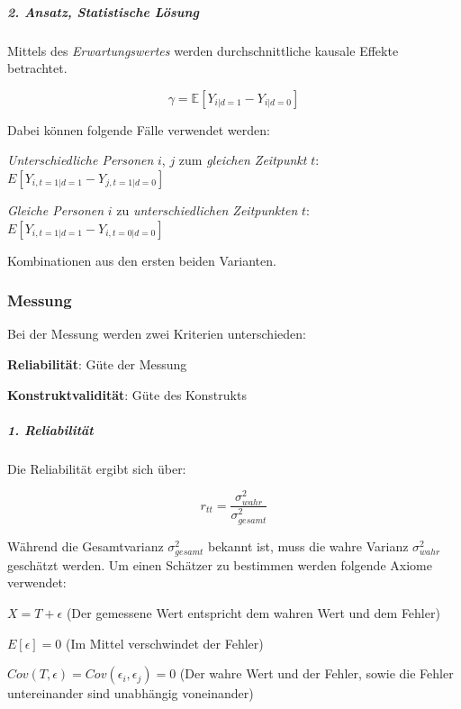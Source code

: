 \documentclass{article}
\numberwithin{equation}{section}
\begin{document}
\subparagraph{2. Ansatz, Statistische Lösung}

Mittels des \emph{Erwartungswertes} werden durchschnittliche kausale Effekte betrachtet.

\begin{equation}
\gamma = \mathbb{E} \left[ Y_{i|d=1} - Y_{i|d=0} \right]
\end{equation}

Dabei können folgende Fälle verwendet werden:

\begin{compactenum}
\item \emph{Unterschiedliche Personen} $i$, $j$ zum \emph{gleichen Zeitpunkt} $t$: $E \left[ Y_{i,t=1|d=1} - Y_{j,t=1|d=0} \right]$
\item \emph{Gleiche Personen} $i$ zu \emph{unterschiedlichen Zeitpunkten} $t$: $E \left[ Y_{i,t=1|d=1} - Y_{i,t=0|d=0} \right]$
\item Kombinationen aus den ersten beiden Varianten.
\end{compactenum}

\subsubsection{Messung}
\label{sec:einf-messung}

Bei der Messung werden zwei Kriterien unterschieden:

\begin{compactitem}
\item \textbf{Reliabilität}: Güte der Messung
\item \textbf{Konstruktvalidität}: Güte des Konstrukts
\end{compactitem}

\subparagraph{1. Reliabilität}

Die Reliabilität ergibt sich über:

\begin{equation}
r_{tt} = \frac{\sigma^2_{wahr}}{\sigma^2_{gesamt}}
\end{equation}

Während die Gesamtvarianz $\sigma^2_{gesamt}$ bekannt ist, muss die wahre Varianz $\sigma^2_{wahr}$ geschätzt werden. Um einen Schätzer zu bestimmen werden folgende Axiome verwendet:

\begin{compactenum}
\item $X = T + \epsilon$ (Der gemessene Wert entspricht dem wahren Wert und dem Fehler)
\item $E[\epsilon] = 0$ (Im Mittel verschwindet der Fehler)
\item $Cov(T, \epsilon) = Cov(\epsilon_i, \epsilon_j) = 0$ (Der wahre Wert und der Fehler, sowie die Fehler untereinander sind unabhängig voneinander)
\end{compactenum}
\end{document}
